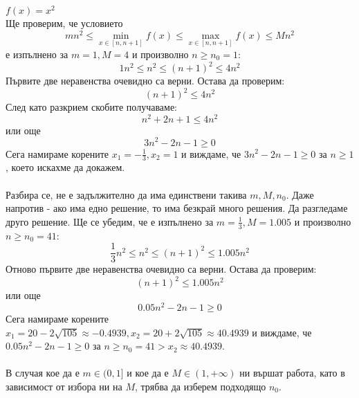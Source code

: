 \begin{example}
	$f(x)=x^2$\\\noindent
	Ще проверим, че условието
	\begin{equation}\label{eqn-well-distributed}
		mn^2\le\min\limits_{x\in[n,n+1]}f(x)\le\max\limits_{x\in[n,n+1]}f(x)\le Mn^2
	\end{equation}
	е изпълнено за $m=1,M=4$ и произволно $n\ge n_0=1$:
	\begin{equation*}
		1n^2\le n^2\le (n+1)^2\le4n^2
	\end{equation*}
 	Първите две неравенства очевидно са верни. Остава да проверим:
 	\begin{equation*}
 		(n+1)^2\le4n^2
 	\end{equation*}
 	След като разкрием скобите получаваме:
 	\begin{equation*}
 		n^2+2n+1\le4n^2
 	\end{equation*}
 	или още
 	\begin{equation*}
 		3n^2-2n-1\ge0
 	\end{equation*}
 	Сега намираме корените $x_1=-\frac13,x_2=1$ и виждаме, че $3n^2-2n-1\ge0$ за $n\ge1$, което искахме да докажем.\\\\
 	\noindent
 	Разбира се, не е задължително да има единствени такива $m,M,n_0$. Даже напротив - ако има едно решение, то има безкрай много решения. Да разгледаме друго решение. Ще се убедим, че е изпълнено за $m=\frac13,M=1.005$ и произволно $n\ge n_0=41$:
 	\begin{equation*}
 		\frac13n^2\le n^2\le (n+1)^2\le1.005n^2
 	\end{equation*}
 	Отново първите две неравенства очевидно са верни. Остава да проверим:
 	\begin{equation*}
 		(n+1)^2\le1.005n^2
 	\end{equation*}
 	или още
 	\begin{equation*}
 		0.05n^2-2n-1\ge0
 	\end{equation*}
 	Сега намираме корените $x_1=20-2\sqrt{105}\approx-0.4939,x_2=20+2\sqrt{105}\approx40.4939$ и виждаме, че $0.05n^2-2n-1\ge0$ за $n\ge n_0=41>x_2\approx40.4939$.\\\\
 	\noindent
 	В случая кое да е $m\in(0,1]$ и кое да е $M\in(1,+\infty)$ ни вършат работа, като в зависимост от избора ни на $M$, трябва да изберем подходящо $n_0$.
\end{example}\leavevmode\newline

